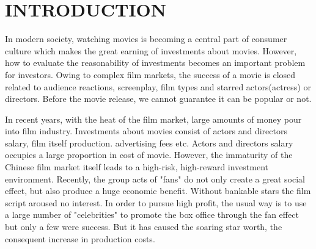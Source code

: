 \section{INTRODUCTION}
\par In modern society, watching movies is becoming a central part of consumer culture which makes the great earning of investments about movies. However, how to evaluate the reasonability of investments becomes an important problem for investors. Owing to complex film markets,  the success of a movie is closed related to audience reactions, screenplay, film types and starred actors(actress) or directors.  Before the movie release, we cannot guarantee it can be popular or not.
\par In recent years, with the heat of the film market, large amounts of money pour into film industry. Investments about movies consist of actors and directors salary,  film itself production. advertising fees etc. Actors and directors salary occupies a large proportion in cost of movie. However, the immaturity of the Chinese film market itself leads to a high-risk, high-reward investment environment.  Recently, the group acts of "fans" do not only create a great social effect, but also produce a huge economic benefit. Without bankable stars the film script aroused no interest. In order to pursue high profit, the usual way is to use a large number of "celebrities" to promote the box office through the fan effect but only a few were success. But it has caused the soaring star worth, the consequent increase in production costs.

